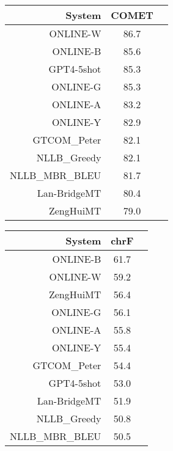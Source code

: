 \documentclass[11pt]{article}
\begin{document}
\begin{table}  
\scriptsize
\begin{subtable}[t]{0.33\textwidth}
\begin{tabular}{rcc}
\toprule 
System  & COMET \\ 
\midrule 
\rowcolor{ashgrey} ONLINE-W  & 86.7 \\ 
\rowcolor{ashgrey} ONLINE-B  & 85.6 \\ 
\rowcolor{ashgrey} GPT4-5shot  & 85.3 \\ 
\rowcolor{ashgrey} ONLINE-G  & 85.3 \\ 
\rowcolor{ashgrey} ONLINE-A  & 83.2 \\ 
\rowcolor{ashgrey} ONLINE-Y & 82.9 \\ 
\rowcolor{ashgrey} GTCOM\_Peter  & 82.1 \\ 
\rowcolor{ashgrey} NLLB\_Greedy  & 82.1 \\ 
\rowcolor{ashgrey} NLLB\_MBR\_BLEU  & 81.7 \\ 
\rowcolor{ashgrey} Lan-BridgeMT  & 80.4 \\ 
\rowcolor{ashgrey} ZengHuiMT  & 79.0 \\ 
\bottomrule 
\end{tabular} 
\end{subtable}
\begin{subtable}[t]{0.33\textwidth}
\begin{tabular}{rcc}
\toprule 
System  & chrF \\ 
\midrule 
\rowcolor{ashgrey} ONLINE-B  & 61.7 \\ 
\rowcolor{ashgrey} ONLINE-W  & 59.2 \\ 
\rowcolor{ashgrey} ZengHuiMT  & 56.4 \\ 
\rowcolor{ashgrey} ONLINE-G  & 56.1 \\ 
\rowcolor{ashgrey} ONLINE-A  & 55.8 \\ 
\rowcolor{ashgrey} ONLINE-Y  & 55.4 \\ 
\rowcolor{ashgrey} GTCOM\_Peter  & 54.4 \\ 
\rowcolor{ashgrey} GPT4-5shot &53.0 \\ 
\rowcolor{ashgrey} Lan-BridgeMT  & 51.9 \\ 
\rowcolor{ashgrey} NLLB\_Greedy  & 50.8 \\ 
\rowcolor{ashgrey} NLLB\_MBR\_BLEU  & 50.5 \\ 
\bottomrule 
\end{tabular} 
\end{subtable} 
\begin{subtable}[t]{0.33\textwidth}

\end{subtable}
\end{table}
\end{document}
